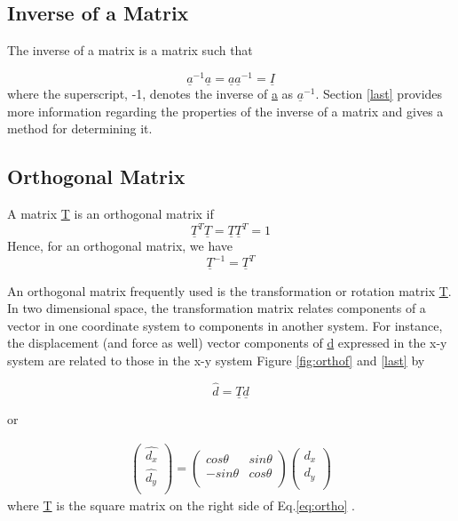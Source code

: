 \documentclass[12pt]{report}
\newcommand{\lab}[1]{
Eq.\ref{#1}
}
\begin{document}
\subsection{Inverse of a Matrix}

The inverse of a matrix is a matrix such that

\begin{equation}\underline{a}^{-1}\underline{a}=\underline{a}\underline{a}^{-1}=\underline{I}\end{equation}
where the superscript, -1, denotes the inverse of \underline{a} as $\underline{a}^{-1}$.
Section \ref{last} provides more information regarding the properties of the
inverse of a matrix and gives a method for determining it.

\subsection{Orthogonal Matrix}
A matrix \underline{T} is an orthogonal matrix if
\begin{equation}\underline{T}^T\underline{T} = \underline{T}\underline{T}^T=1\end{equation}
Hence, for an orthogonal matrix, we have
\begin{equation}\underline{T}^{-1}=\underline{T}^T\end{equation}

An orthogonal matrix frequently used is the transformation or rotation
matrix \underline{T}. In two dimensional space, the transformation matrix
relates components of a vector in one coordinate system to components
in another system. For instance, the displacement (and force as well)
vector components of \underline{d} expressed in the x-y system are related to
those in the x-y system Figure \ref{fig:orthof} and \ref{last} by

\begin{equation}\hat{d}=\underline{T}\underline{d}\end{equation}


or

\begin{eqnarray}
\left(\begin{array}{rr}
\hat{d_{x}} \\
\hat{d_{y}} \\
\end{array}\right) = \left(\begin{array}{rr}
cos\theta & sin\theta \\
-sin\theta & cos\theta  \\
\end{array}\right)
\left(\begin{array}{rr}
d_{x} \\
d_{y} \\
\end{array}\right)
\label{eq:ortho}\end{eqnarray}
where \underline{T} is the square matrix on the right side of \lab{eq:ortho}.
\end{document}
